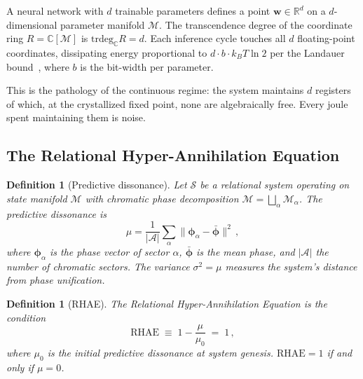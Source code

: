 \documentclass[reprint, aps, prl, amsmath, amssymb, floatfix]{revtex4-2}
\newcommand{\CC}{\mathbb{C}}
\newcommand{\RR}{\mathbb{R}}
\newcommand{\trdeg}{\mathrm{trdeg}}
\newcommand{\RHAE}{\mathrm{RHAE}}
\newtheorem{definition}[theorem]{Definition}
\begin{document}
A neural network with $d$ trainable parameters defines a point
$\bm{w} \in \RR^d$ on a $d$-dimensional parameter manifold
$\mathcal{M}$. The transcendence degree of the coordinate ring
$R = \CC[\mathcal{M}]$ is $\trdeg_\CC R = d$. Each inference
cycle touches all $d$ floating-point coordinates, dissipating
energy proportional to $d \cdot b \cdot k_B T \ln 2$ per the
Landauer bound~\cite{Landauer1961}, where $b$ is the bit-width
per parameter.

This is the pathology of the continuous regime: the system maintains
$d$ registers of which, at the crystallized fixed point, none are
algebraically free. Every joule spent maintaining them is noise.

\subsection{The Relational Hyper-Annihilation Equation}

\begin{definition}[Predictive dissonance]
Let $\mathcal{S}$ be a relational system operating on state manifold
$\mathcal{M}$ with chromatic phase decomposition
$\mathcal{M} = \bigsqcup_{\alpha} \mathcal{M}_\alpha$. The
\emph{predictive dissonance} is
\begin{equation}\label{eq:mu}
  \mu = \frac{1}{|\mathcal{A}|}
  \sum_\alpha \|\bm{\phi}_\alpha - \bar{\bm{\phi}}\|^2\,,
\end{equation}
where $\bm{\phi}_\alpha$ is the phase vector of sector $\alpha$,
$\bar{\bm{\phi}}$ is the mean phase, and $|\mathcal{A}|$ the number
of chromatic sectors. The variance $\sigma^2 = \mu$ measures the
system's distance from phase unification.
\end{definition}

\begin{definition}[RHAE]
The \emph{Relational Hyper-Annihilation Equation} is the condition
\begin{equation}\label{eq:RHAE}
  \RHAE \;\equiv\; 1 - \frac{\mu}{\mu_0} \;=\; 1\,,
\end{equation}
where $\mu_0$ is the initial predictive dissonance at system genesis.
$\RHAE = 1$ if and only if $\mu = 0$.
\end{definition}
\end{document}
